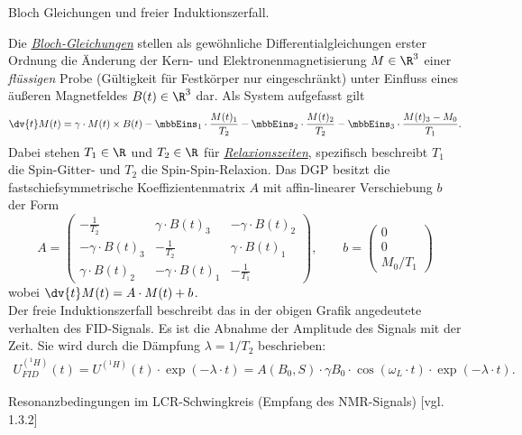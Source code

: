 \documentclass{subfiles}
\begin{document}
    \begin{Frage}
        Bloch Gleichungen und freier Induktionszerfall.
    \end{Frage}
    \begin{Antwort}
        Die \href{https://de.wikipedia.org/wiki/Bloch-Gleichungen}{\emph{Bloch-Gleichungen}} stellen als gewöhnliche Differentialgleichungen erster Ordnung die Änderung der Kern- und Elektronenmagnetisierung $M\in\R^3$ einer \emph{flüssigen} Probe (Gültigkeit für Festkörper nur eingeschränkt) unter Einfluss eines äußeren Magnetfeldes $B(t)\in\R^3$ dar. Als System aufgefasst gilt 
        \[
            \dv{t}M(t) = \gamma\cdot M(t)\times B(t) - \mbbEins_1\cdot\frac{M(t)_1}{T_2} - \mbbEins_2\cdot\frac{M(t)_2}{T_2} - \mbbEins_3\cdot\frac{M(t)_3 - M_0}{T_1}.
        \]
        Dabei stehen $T_1\in\R$ und $T_2\in\R$ für \href{}{\emph{Relaxionszeiten}}, spezifisch beschreibt $T_1$ die Spin-Gitter- und $T_2$ die Spin-Spin-Relaxion. Das DGP besitzt die fastschiefsymmetrische Koeffizientenmatrix $A$ mit affin-linearer Verschiebung $b$ der Form
        \[
            A = \begin{pmatrix}
                -\frac{1}{T_2} & \gamma\cdot B(t)_3 & -\gamma\cdot B(t)_2 \\
                -\gamma\cdot B(t)_3 & -\frac{1}{T_2} & \gamma\cdot B(t)_1 \\
                \gamma\cdot B(t)_2 & -\gamma\cdot B(t)_1 & -\frac{1}{T_1}
            \end{pmatrix},\qquad b = \begin{pmatrix}
                0\\
                0\\
                M_0/T_1
            \end{pmatrix}
        \]
        wobei $\dv{t}M(t) = A\cdot M(t) + b$. \\

        Der freie Induktionszerfall beschreibt das in der obigen Grafik angedeutete verhalten des FID-Signals. Es ist die Abnahme der Amplitude des Signals mit der Zeit. Sie wird durch die Dämpfung $\lambda = 1/T_2$ beschrieben:
        \begin{align}
            U^{(^1H)}_{FID}(t) = U^{(^1H)}(t)\cdot\exp(-\lambda\cdot t) = A(B_0,S)\cdot\gamma B_0\cdot\cos(\omega_L\cdot t)\cdot\exp(-\lambda\cdot t).
        \end{align}
    \end{Antwort}

    \begin{Frage}
        Resonanzbedingungen im LCR-Schwingkreis (Empfang des NMR-Signals) [vgl. 1.3.2]
    \end{Frage}
    \begin{Antwort}
        
    \end{Antwort}
\end{document}
